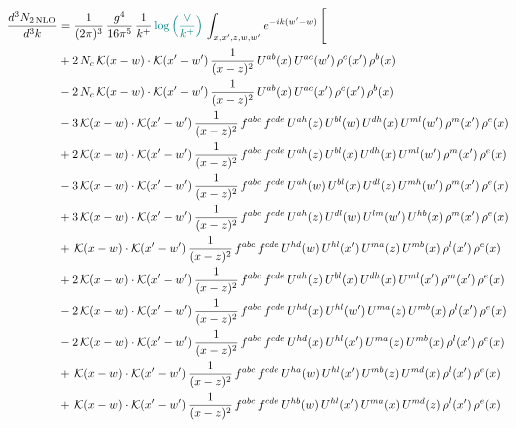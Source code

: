 \documentclass[9pt]{article}
\numberwithin{equation}{section}
\begin{document}
\begin{align}
\frac{d^{3}N_{2\,\mathrm{NLO}}}{d^{3}k} & = \frac{1}{(2\pi)^{3}}\,\frac{g^{4}}{16\pi^{5}}\,\frac{1}{k^{+}}\,{\color{teal}\log{\left(\frac{\vee}{k^{+}}\right)}}\,\int_{x,x',z,w,w'}e^{-ik(w'-w)}\,\Bigg[
\notag\\ &+2\,N_{c}\,\mathcal{K}(x-w)\cdot\mathcal{K}(x'-w')\,\frac{1}{(x-z)^{2}}\,U^{ab}(x)\,U^{ac}(w')\,\rho^{c}(x')\,\rho^{b}(x)\notag\\
&-2\,N_{c}\,\mathcal{K}(x-w)\cdot\mathcal{K}(x'-w')\,\frac{1}{(x-z)^{2}}\,U^{ab}(x)\,U^{ac}(x')\,\rho^{c}(x')\,\rho^{b}(x)\notag\\
&-3\,\mathcal{K}(x-w)\cdot\mathcal{K}(x'-w')\,\frac{1}{(x-z)^{2}}\,f^{abc}\,f^{cde}\,U^{ah}(z)\,U^{bl}(w)\,U^{dh}(x)\,U^{ml}(w')\,\rho^{m}(x')\,\rho^{e}(x)\notag\\
&+2\,\mathcal{K}(x-w)\cdot\mathcal{K}(x'-w')\,\frac{1}{(x-z)^{2}}\,f^{abc}\,f^{cde}\,U^{ah}(z)\,U^{bl}(x)\,U^{dh}(x)\,U^{ml}(w')\,\rho^{m}(x')\,\rho^{e}(x)\notag\\
&-3\,\mathcal{K}(x-w)\cdot\mathcal{K}(x'-w')\,\frac{1}{(x-z)^{2}}\,f^{abc}\,f^{cde}\,U^{ah}(w)\,U^{bl}(x)\,U^{dl}(z)\,U^{mh}(w')\,\rho^{m}(x')\,\rho^{e}(x)\notag\\
&+3\,\mathcal{K}(x-w)\cdot\mathcal{K}(x'-w')\,\frac{1}{(x-z)^{2}}\,f^{abc}\,f^{cde}\,U^{ah}(z)\,U^{dl}(w)\,U^{lm}(w')\,U^{hb}(x)\,\rho^{m}(x')\,\rho^{e}(x)\notag\\
&+\,\mathcal{K}(x-w)\cdot\mathcal{K}(x'-w')\,\frac{1}{(x-z)^{2}}\,f^{abc}\,f^{cde}\,U^{hd}(w)\,U^{hl}(x')\,U^{ma}(z)\,U^{mb}(x)\,\rho^{l}(x')\,\rho^{e}(x)\notag\\
&+2\,\mathcal{K}(x-w)\cdot\mathcal{K}(x'-w')\,\frac{1}{(x-z)^{2}}\,f^{abc}\,f^{cde}\,U^{ah}(z)\,U^{bl}(x)\,U^{dh}(x)\,U^{ml}(x')\,\rho^{m}(x')\,\rho^{e}(x)\notag\\
&-2\,\mathcal{K}(x-w)\cdot\mathcal{K}(x'-w')\,\frac{1}{(x-z)^{2}}\,f^{abc}\,f^{cde}\,U^{hd}(x)\,U^{hl}(w')\,U^{ma}(z)\,U^{mb}(x)\,\rho^{l}(x')\,\rho^{e}(x)\notag\\
&-2\,\mathcal{K}(x-w)\cdot\mathcal{K}(x'-w')\,\frac{1}{(x-z)^{2}}\,f^{abc}\,f^{cde}\,U^{hd}(x)\,U^{hl}(x')\,U^{ma}(z)\,U^{mb}(x)\,\rho^{l}(x')\,\rho^{e}(x)\notag\\
&+\,\mathcal{K}(x-w)\cdot\mathcal{K}(x'-w')\,\frac{1}{(x-z)^{2}}\,f^{abc}\,f^{cde}\,U^{ha}(w)\,U^{hl}(x')\,U^{mb}(z)\,U^{md}(x)\,\rho^{l}(x')\,\rho^{e}(x)\notag\\
&+\,\mathcal{K}(x-w)\cdot\mathcal{K}(x'-w')\,\frac{1}{(x-z)^{2}}\,f^{abc}\,f^{cde}\,U^{hb}(w)\,U^{hl}(x')\,U^{ma}(x)\,U^{md}(z)\,\rho^{l}(x')\,\rho^{e}(x)\notag\\

\end{align}
\end{document}
